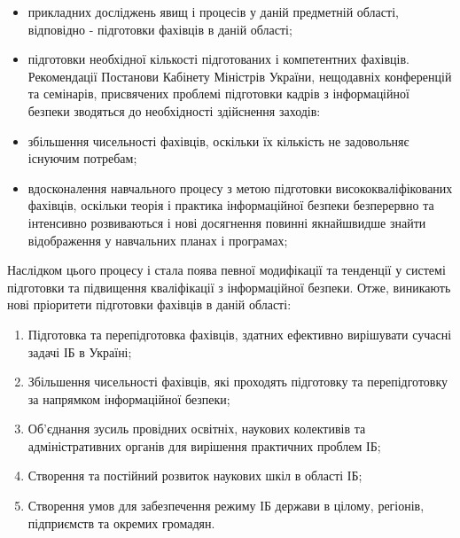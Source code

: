 \begin{itemize}
\item{прикладних досліджень явищ і процесів у даній предметній області, відповідно - підготовки фахівців в даній області;}
\item{підготовки необхідної кількості підготованих і компетентних фахівців.
Рекомендації Постанови Кабінету Міністрів України, нещодавніх конференцій та семінарів, присвячених проблемі підготовки кадрів з інформаційної безпеки зводяться до необхідності здійснення заходів:}
\item{збільшення чисельності фахівців, оскільки їх кількість не задовольняє існуючим потребам;}
\item{вдосконалення навчального процесу з метою підготовки висококваліфікованих фахівців, оскільки теорія і практика інформаційної безпеки безперервно та інтенсивно розвиваються і нові досягнення повинні якнайшвидше знайти відображення у навчальних планах і програмах;}
\end{itemize}

Наслідком цього процесу і стала поява певної модифікації та тенденції у системі підготовки та підвищення кваліфікації з інформаційної безпеки.
Отже, виникають нові пріоритети підготовки фахівців в даній області:
\begin{enumerate}
\item Підготовка та перепідготовка фахівців, здатних ефективно вирішувати сучасні задачі ІБ в Україні;
\item Збільшення чисельності фахівців, які проходять підготовку та перепідготовку за напрямком інформаційної безпеки;
\item Об'єднання зусиль провідних освітніх, наукових колективів та адміністративних органів для вирішення практичних проблем ІБ;
\item Створення та постійний розвиток наукових шкіл в області ІБ;
\item Створення умов для забезпечення режиму ІБ держави в цілому, регіонів, підприємств та окремих громадян.
\end{enumerate}

